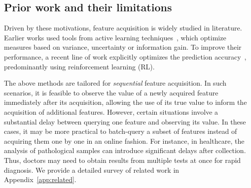 \documentclass[letterpaper]{article}
\renewcommand{\cite}{\citep}
\begin{document}
\subsection{Prior work and their limitations}
Driven by these motivations, feature acquisition is widely studied in literature. Earlier works  used tools from active learning techniques~\cite{act1,act2,act3,gong2019icebreaker,eddi}, which optimize measures based on variance, uncertainty or information gain. To improve their performance, a recent line of work   explicitly optimizes the prediction accuracy~\cite{jafa,acflow,gsm,jaaai,jml,dulac2012sequential,l1,l2,hu2018survey,yu2016scalable}, predominantly using reinforcement learning (RL).

The   above methods are tailored for \emph{sequential} feature acquisition. In such scenarios, it is feasible to observe the value of a newly acquired feature immediately after its acquisition, allowing the use of its true value to inform the acquisition of additional features. However, certain situations involve a substantial delay between querying one feature and observing its value. In these cases, it may be more practical to batch-query a subset of features instead of acquiring them one by one in an online fashion. For instance, in healthcare, the analysis of pathological samples can introduce significant delays after collection. Thus, doctors may need to obtain results from multiple tests at once for rapid diagnosis.
We provide a detailed survey of related work in Appendix~\ref{app:related}.






\end{document}
